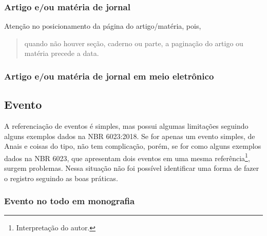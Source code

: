 \subsubsection{Artigo e/ou matéria de jornal} %
  Atenção no posicionamento da página do artigo/matéria, pois, \blockcquote[p. 15]{livro:abnt-nbr6023:2018}{quando não houver seção, caderno ou parte, a paginação do artigo ou matéria precede a data.}

  \exEssencial
  
  \exOutros

\subsubsection{Artigo e/ou matéria de jornal em meio eletrônico} %
  \exEssencial

  \exOutros

\subsection{Evento} %
A referenciação de eventos é simples, mas possui algumas limitações seguindo alguns exemplos dados na NBR 6023:2018. Se for apenas um evento simples, de Anais e coisas do tipo, não tem complicação, porém, se for como alguns exemplos dados na NBR 6023, que apresentam dois eventos em uma mesma referência\footnote{Interpretação do autor.}, surgem problemas. Nessa situação não foi possível identificar uma forma de fazer o registro seguindo as boas práticas.

\subsubsection{Evento no todo em monografia} %
  \exEssencial

  \exOutros

